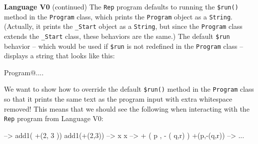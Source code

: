 \begin{minipage}[t]{\sw}
\slidenumber
\LARGE
{\bf Language V0} (continued)\exx
The \verb'Rep' program defaults to running
the \verb'$run()' method in the \verb'Program' class,
which prints the \verb'Program' object as a \verb'String'.
(Actually, it prints the \verb'_Start' object as a \verb'String',
but since the \verb'Program' class extends the \verb'_Start' class,
these behaviors are the same.)
The default \verb'$run' behavior -- 
which would be used if \verb'$run' is not redefined in the \verb'Program' class --
displays a string that looks like this:
{\Large
\begin{qv}
Program@....
\end{qv}
}
We want to show how to override the default \verb'$run()' method
in the \verb'Program' class
so that it prints the same text as the program input
with extra white\-space removed!\exx
This means that we should see the following when interacting
with the \verb'Rep' program from Language V0:
{\Large
\begin{qv}
--> add1( +(2, 3   ))
add1(+(2,3))
--> x
x
--> +  ( p  ,
- ( q,r)  )
+(p,-(q,r))
--> ...
\end{qv}
}
\end{minipage}
\clearpage
